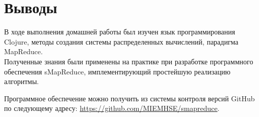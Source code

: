 \documentclass[document.tex]{subfiles}
\begin{document}
\newpage
\section{Выводы}

В ходе выполнения домашней работы был изучен язык программирования Clojure,
методы создания системы распределенных вычислений, парадигма MapReduce. \\
Полученные знания были применены на практике при разработке программного
обеспечения sMapReduce, имплементирующий простейшую реализацию алгоритмы.

Программное обеспечение можно получить из системы контроля версий GitHub
по следующему адресу: {\url{https://github.com/MIEMHSE/smapreduce}}.
\end{document}
